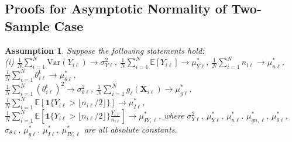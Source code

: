 \documentclass[12pt,letterpaper]{article}
\newtheorem{assumption}{Assumption}[section]
\begin{document}
\subsection{Proofs for Asymptotic Normality of Two-Sample Case}\label{appendix:two-sample:case}
\begin{assumption}\label{ass:additional:two-sample}
Suppose the following statements hold:\\
\noindent (i) $\displaystyle\frac{1}{N}\sum_{i=1}^N\mathrm{Var}(Y_{i\ell})\rightarrow\sigma_{Y\ell}^2$,  $\displaystyle\frac{1}{N}\sum_{i=1}^N\mathbb{E}[Y_{i\ell}]\rightarrow\mu_{Y\ell}^*$, $\displaystyle\frac{1}{N}\sum_{i=1}^Nn_{i\ell}\rightarrow\mu_{n\ell}^*$, $\displaystyle\frac{1}{N}\sum_{i=1}^N\theta_{i\ell}^{\mathrm{t}}\rightarrow\mu_{\theta\ell}^*$, \\
$\displaystyle\frac{1}{N}\sum_{i=1}^N\left(\theta_{i\ell}^{\mathrm{t}}\right)^2\rightarrow\sigma_{\theta\ell}^2$, $\displaystyle\frac{1}{N}\sum_{i=1}^Ng_{\ell}(\mathbf{X}_{i\ell})\rightarrow\mu_{g\ell}^*$, $\displaystyle\frac{1}{N}\sum_{i=1}^N\mathbb{E}\left[\mathbf{1}\{Y_{i\ell}>\lfloor n_{i\ell}/2\rfloor\}\right]\rightarrow\mu_{I\ell}^*$,\\ $\displaystyle\frac{1}{N}\sum_{i=1}^N\mathbb{E}\left[\mathbf{1}\{Y_{i\ell}>\lfloor n_{i\ell}/2\rfloor\}\frac{Y_{i\ell}}{n_{i\ell}}\right]\rightarrow\mu_{IY,\ell}^*$, where $\sigma_{Y\ell}^2$, $\mu_{Y\ell}^*$, $\mu_{n\ell}^*$, $\mu_{gn,\ell}^*$, $\mu_{\theta\ell}^*$, $\sigma_{\theta\ell}$, $\mu_{g\ell}^*$, $\mu_{I\ell}^*$, $\mu_{IY,\ell}^*$ are all absolute constants.


\end{assumption}
\end{document}
